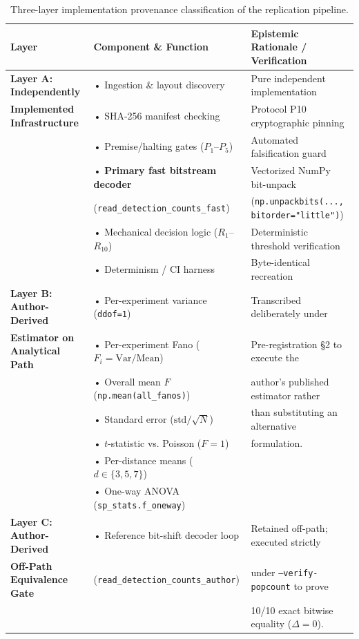 \documentclass[10pt,a4paper,onecolumn]{article}
\begin{document}
\begin{table}[htbp]
\centering
\small
\begin{tabular}{lp{6.5cm}p{5.5cm}}
\toprule
\textbf{Layer} & \textbf{Component \& Function} & \textbf{Epistemic Rationale / Verification} \\
\midrule
\textbf{Layer A: Independently} & • Ingestion \& layout discovery & Pure independent implementation \\
\textbf{Implemented Infrastructure} & • SHA-256 manifest checking & Protocol P10 cryptographic pinning \\
& • Premise/halting gates ($P_1$--$P_5$) & Automated falsification guard \\
& • \textbf{Primary fast bitstream decoder} & Vectorized NumPy bit-unpack \\
& \quad (\texttt{read\_detection\_counts\_fast}) & (\texttt{np.unpackbits(..., bitorder="little")}) \\
& • Mechanical decision logic ($R_1$--$R_{10}$) & Deterministic threshold verification \\
& • Determinism / CI harness & Byte-identical recreation \\
\midrule
\textbf{Layer B: Author-Derived} & • Per-experiment variance (\texttt{ddof=1}) & Transcribed deliberately under \\
\textbf{Estimator on Analytical Path} & • Per-experiment Fano ($F_i = \text{Var}/\text{Mean}$) & Pre-registration \S2 to execute the \\
& • Overall mean $F$ (\texttt{np.mean(all\_fanos)}) & author's published estimator rather \\
& • Standard error ($\text{std} / \sqrt{N}$) & than substituting an alternative \\
& • $t$-statistic vs. Poisson ($F=1$) & formulation. \\
& • Per-distance means ($d \in \{3, 5, 7\}$) & \\
& • One-way ANOVA (\texttt{sp\_stats.f\_oneway}) & \\
\midrule
\textbf{Layer C: Author-Derived} & • Reference bit-shift decoder loop & Retained off-path; executed strictly \\
\textbf{Off-Path Equivalence Gate} & \quad (\texttt{read\_detection\_counts\_author}) & under \texttt{--verify-popcount} to prove \\
& & 10/10 exact bitwise equality ($\Delta = 0$). \\
\bottomrule
\end{tabular}
\caption{Three-layer implementation provenance classification of the replication pipeline.}
\label{tab:provenance}
\end{table}
\end{document}
